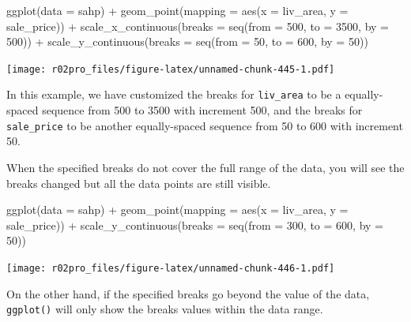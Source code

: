 \documentclass[
]{book}
\newenvironment{Shaded}{\begin{snugshade}}{\end{snugshade}}
\newcommand{\AttributeTok}[1]{\textcolor[rgb]{0.77,0.63,0.00}{#1}}
\newcommand{\DecValTok}[1]{\textcolor[rgb]{0.00,0.00,0.81}{#1}}
\newcommand{\FunctionTok}[1]{\textcolor[rgb]{0.00,0.00,0.00}{#1}}
\newcommand{\NormalTok}[1]{#1}
\newcommand{\SpecialCharTok}[1]{\textcolor[rgb]{0.00,0.00,0.00}{#1}}
\begin{document}
\begin{Shaded}
\begin{Highlighting}[]
\FunctionTok{ggplot}\NormalTok{(}\AttributeTok{data =}\NormalTok{ sahp) }\SpecialCharTok{+} \FunctionTok{geom\_point}\NormalTok{(}\AttributeTok{mapping =} \FunctionTok{aes}\NormalTok{(}\AttributeTok{x =}\NormalTok{ liv\_area, }\AttributeTok{y =}\NormalTok{ sale\_price)) }\SpecialCharTok{+}
  \FunctionTok{scale\_x\_continuous}\NormalTok{(}\AttributeTok{breaks =} \FunctionTok{seq}\NormalTok{(}\AttributeTok{from =} \DecValTok{500}\NormalTok{, }\AttributeTok{to =} \DecValTok{3500}\NormalTok{, }\AttributeTok{by =} \DecValTok{500}\NormalTok{)) }\SpecialCharTok{+}
  \FunctionTok{scale\_y\_continuous}\NormalTok{(}\AttributeTok{breaks =} \FunctionTok{seq}\NormalTok{(}\AttributeTok{from =} \DecValTok{50}\NormalTok{, }\AttributeTok{to =} \DecValTok{600}\NormalTok{, }\AttributeTok{by =} \DecValTok{50}\NormalTok{))}
\end{Highlighting}
\end{Shaded}

\texttt{[image: r02pro\_files/figure-latex/unnamed-chunk-445-1.pdf]}

In this example, we have customized the breaks for \texttt{liv\_area} to be a equally-spaced sequence from 500 to 3500 with increment 500, and the breaks for \texttt{sale\_price} to be another equally-spaced sequence from 50 to 600 with increment 50.

When the specified breaks do not cover the full range of the data, you will see the breaks changed but all the data points are still visible.

\begin{Shaded}
\begin{Highlighting}[]
\FunctionTok{ggplot}\NormalTok{(}\AttributeTok{data =}\NormalTok{ sahp) }\SpecialCharTok{+} \FunctionTok{geom\_point}\NormalTok{(}\AttributeTok{mapping =} \FunctionTok{aes}\NormalTok{(}\AttributeTok{x =}\NormalTok{ liv\_area, }\AttributeTok{y =}\NormalTok{ sale\_price)) }\SpecialCharTok{+}
  \FunctionTok{scale\_y\_continuous}\NormalTok{(}\AttributeTok{breaks =} \FunctionTok{seq}\NormalTok{(}\AttributeTok{from =} \DecValTok{300}\NormalTok{, }\AttributeTok{to =} \DecValTok{600}\NormalTok{, }\AttributeTok{by =} \DecValTok{50}\NormalTok{))}
\end{Highlighting}
\end{Shaded}

\texttt{[image: r02pro\_files/figure-latex/unnamed-chunk-446-1.pdf]}

On the other hand, if the specified breaks go beyond the value of the data, \texttt{ggplot()} will only show the breaks values within the data range.
\end{document}
